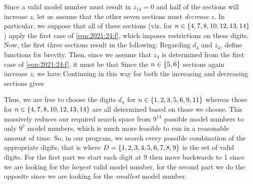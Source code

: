 \documentclass{article}
\begin{document}
{    Since a valid model number must result in $z_{14} = 0$ and half of the sections will increase $z$, let us assume that the other seven sections must \emph{decrease} $z$.
    In particular, we suppose that all of these sections (viz. for $n \in \left\{ 4, 7, 8, 10, 12, 13, 14 \right\}$) apply the first case of \eqref{eqn:2021:24:f}, which imposes restrictions on these digits.
    Now, the first three sections result in the following:
    Regarding $d_4$ and $z_4$, define functions
    for brevity.
    Then, since we assume that $z_4$ is determined from the first case of \eqref{eqn:2021:24:f}, it must be that
    Since the $n \in \left\{ 5, 6 \right\}$ sections again increase $z$, we have
    Continuing in this way for both the increasing and decreasing sections gives

    Thus, we are free to choose the digits $d_n$ for $n \in \left\{ 1, 2, 3, 5, 6, 9, 11 \right\}$ whereas those for $n \in \left\{ 4, 7, 8, 10, 12, 13, 14 \right\}$ are all determined based on those we choose.
    This massively reduces our required search space from $9^{14}$ possible model numbers to only $9^7$ model numbers, which is much more feasible to run in a reasonable amount of time.
    So, in our program, we search every possible combination of the appropriate digits, that is
    where $D = \left\{ 1, 2, 3, 4, 5, 6, 7, 8, 9 \right\}$ is the set of valid digits.
    For the first part we start each digit at $9$ then move backwards to $1$ since we are looking for the \emph{largest} valid model number, for the second part we do the opposite since we are looking for the \emph{smallest} model number.

}
\end{document}
